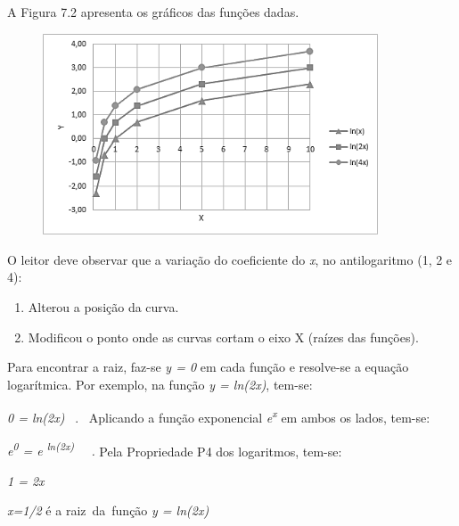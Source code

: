 \begin{texemplo}
A Figura 7.2 apresenta os gráficos das funções dadas.

\begin{figure}[H]
	\begin{Center}
		\includegraphics[width=3.92in,height=2.35in]{capitulos/logaritmos_e_funcao_logaritmica/media/image6.png}
	\end{Center}
\end{figure}

O leitor deve observar que a variação do coeficiente do \textit{x}, no antilogaritmo (1, 2 e 4):

\begin{enumerate}
	\item Alterou a posição da curva.

	\item Modificou o ponto onde as curvas cortam o eixo X (raízes das funções). 
\end{enumerate}

Para encontrar a raiz, faz-se \textit{y = 0} em cada função e resolve-se a equação logarítmica. Por exemplo, na função \textit{y = ln(2x)}, tem-se:

\textit{0 = ln(2x)}~ .~ Aplicando a função exponencial \textit{e\textsuperscript{x}} em ambos os lados, tem-se:

\textit{e\textsuperscript{0} = e \textsuperscript{ln(2x)}~~ . }Pela Propriedade P4 dos logaritmos, tem-se:

\textit{1 = 2x}

\textit{x=1/2} é a raiz~da~função   \textit{y = ln(2x)} \qedsymbol{}

\end{texemplo}

